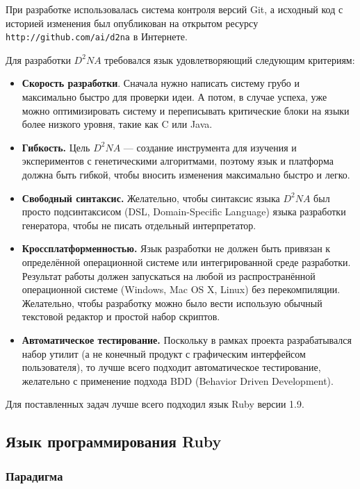 \documentclass[utf8,a5paper,portrait,12pt]{eskdtext}
\begin{document}
При разработке использовалась система контроля версий Git, а исходный код с
историей изменения был опубликован на открытом ресурсу
\texttt{http://github.com/ai/d2na} в Интернете.

Для разработки $D^2NA$ требовался язык удовлетворяющий следующим критериям:
\begin{itemize}
  \item \textbf{Скорость разработки}. Сначала нужно написать систему грубо и
        максимально быстро для проверки идеи. А потом, в случае успеха, уже
        можно оптимизировать систему и переписывать критические блоки на языки
        более низкого уровня, такие как C или Java.
  \item \textbf{Гибкость.} Цель $D^2NA$ — создание инструмента для изучения и
        экспериментов с генетическими алгоритмами, поэтому язык и платформа
        должна быть гибкой, чтобы вносить изменения максимально быстро и легко.
  \item \textbf{Свободный синтаксис.} Желательно, чтобы синтаксис языка $D^2NA$ был
        просто подсинтаксисом (DSL, Domain-Specific Language) языка разработки
        генератора, чтобы не писать отдельный интерпретатор.
  \item \textbf{Кроссплатформенностью.} Язык разработки не должен быть привязан к
        определённой операционной системе или интегрированной среде разработки.
        Результат работы должен запускаться на любой из распространённой
        операционной системе (Windows, Mac OS X, Linux) без перекомпиляции.
        Желательно, чтобы разработку можно было вести использую обычный
        текстовой редактор и простой набор скриптов.
  \item \textbf{Автоматическое тестирование.} Поскольку в рамках проекта
        разрабатывался набор утилит (а не конечный продукт с графическим
        интерфейсом пользователя), то лучше всего подходит автоматическое
        тестирование, желательно с применение подхода BDD (Behavior Driven
        Development).
\end{itemize}

Для поставленных задач лучше всего подходил язык Ruby версии 1.9.

\subsection{Язык программирования Ruby}

\subsubsection{Парадигма}
\end{document}
